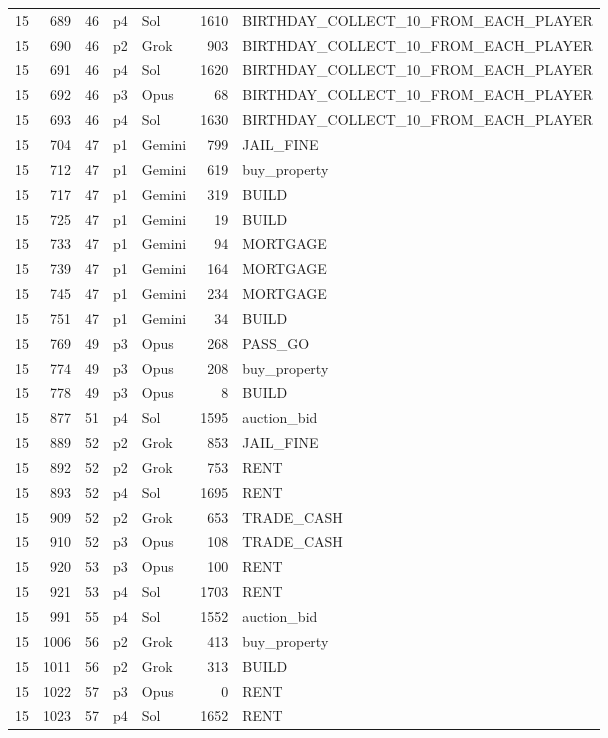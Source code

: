 \begin{longtable}{r r r l l r L{2.2in}}
15 & 689 & 46 & p4 & Sol & 1610 & BIRTHDAY\_COLLECT\_10\_FROM\_EACH\_PLAYER \\
15 & 690 & 46 & p2 & Grok & 903 & BIRTHDAY\_COLLECT\_10\_FROM\_EACH\_PLAYER \\
15 & 691 & 46 & p4 & Sol & 1620 & BIRTHDAY\_COLLECT\_10\_FROM\_EACH\_PLAYER \\
15 & 692 & 46 & p3 & Opus & 68 & BIRTHDAY\_COLLECT\_10\_FROM\_EACH\_PLAYER \\
15 & 693 & 46 & p4 & Sol & 1630 & BIRTHDAY\_COLLECT\_10\_FROM\_EACH\_PLAYER \\
15 & 704 & 47 & p1 & Gemini & 799 & JAIL\_FINE \\
15 & 712 & 47 & p1 & Gemini & 619 & buy\_property \\
15 & 717 & 47 & p1 & Gemini & 319 & BUILD \\
15 & 725 & 47 & p1 & Gemini & 19 & BUILD \\
15 & 733 & 47 & p1 & Gemini & 94 & MORTGAGE \\
15 & 739 & 47 & p1 & Gemini & 164 & MORTGAGE \\
15 & 745 & 47 & p1 & Gemini & 234 & MORTGAGE \\
15 & 751 & 47 & p1 & Gemini & 34 & BUILD \\
15 & 769 & 49 & p3 & Opus & 268 & PASS\_GO \\
15 & 774 & 49 & p3 & Opus & 208 & buy\_property \\
15 & 778 & 49 & p3 & Opus & 8 & BUILD \\
15 & 877 & 51 & p4 & Sol & 1595 & auction\_bid \\
15 & 889 & 52 & p2 & Grok & 853 & JAIL\_FINE \\
15 & 892 & 52 & p2 & Grok & 753 & RENT \\
15 & 893 & 52 & p4 & Sol & 1695 & RENT \\
15 & 909 & 52 & p2 & Grok & 653 & TRADE\_CASH \\
15 & 910 & 52 & p3 & Opus & 108 & TRADE\_CASH \\
15 & 920 & 53 & p3 & Opus & 100 & RENT \\
15 & 921 & 53 & p4 & Sol & 1703 & RENT \\
15 & 991 & 55 & p4 & Sol & 1552 & auction\_bid \\
15 & 1006 & 56 & p2 & Grok & 413 & buy\_property \\
15 & 1011 & 56 & p2 & Grok & 313 & BUILD \\
15 & 1022 & 57 & p3 & Opus & 0 & RENT \\
15 & 1023 & 57 & p4 & Sol & 1652 & RENT \\

\end{longtable}
